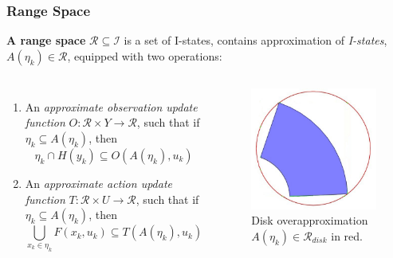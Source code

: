\documentclass[compress]{beamer}
\begin{document}
\begin{frame} \frametitle{Range Space}
\begin{definition}{\textbf{A range space}}
 $\mathcal{R} \subseteq \mathcal{I}$ is a set of I-states, contains
 approximation of \emph{I-states}, $A(\eta_k) \in \mathcal{R}$, equipped with
 two operations:
\end{definition}
\begin{columns}
\begin{enumerate}
\item An \emph{approximate observation update function} $O: \mathcal{R} \times
		Y \to \mathcal{R}$, such that if $\eta_k \subseteq A(\eta_k)$, then
			$$\eta_k \cap H(y_k) \subseteq O(A(\eta_k), u_k)$$
\item An \emph{approximate action update function} $T: \mathcal{R} \times U \to
		\mathcal{R}$, such that if $\eta_k \subseteq A(\eta_k)$, then
			$$\bigcup_{x_k \in \eta_k} F(x_k, u_k) \subseteq T(A(\eta_k), u_k)$$
\end{enumerate}
    \begin{figure}
    \includegraphics[scale=0.3]{rangespace_circle.jpg}
    \caption{Disk overapproximation $A(\eta_k) \in \mathcal{R}_{disk}$ in red.}
    \end{figure}
\end{columns}
\end{frame}
\end{document}
